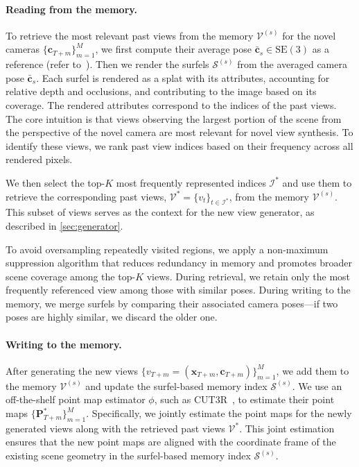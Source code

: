 \paragraph{Reading from the memory.}
To retrieve the most relevant past views from the memory $\mathcal{V}^{(s)}$ for the novel cameras $\{\mathbf{c}_{T+m}\}_{m=1}^M$, we first compute their average pose $\bar{\mathbf{c}}_s \in \mathrm{SE}(3)$ as a reference (refer to~).
Then we render the surfels $\mathcal{S}^{(s)}$ from the averaged camera pose $\bar{\mathbf{c}}_s$.
Each surfel is rendered as a splat with its attributes, accounting for relative depth and occlusions, and contributing to the image based on its coverage.
The rendered attributes correspond to the indices of the past views.
The core intuition is that views observing the largest portion of the scene from the perspective of the novel camera are most relevant for novel view synthesis.
To identify these views, we rank past view indices based on their frequency across all rendered pixels.

We then select the top-$K$ most frequently represented indices $\mathcal{I}^*$ and use them to retrieve the corresponding past views, $\mathcal{V}^* = \{v_t\}_{t \in \mathcal{I}^*}$, from the memory $\mathcal{V}^{(s)}$.
This subset of views serves as the context for the new view generator, as described in \cref{sec:generator}.

To avoid oversampling repeatedly visited regions, we apply a non-maximum suppression algorithm that reduces redundancy in memory and promotes broader scene coverage among the top-$K$ views.
During retrieval, we retain only the most frequently referenced view among those with similar poses.
During writing to the memory, we merge surfels by comparing their associated camera poses—if two poses are highly similar, we discard the older one.

\paragraph{Writing to the memory.}
After generating the new views $\{v_{T+m}=(\mathbf{x}_{T+m},\mathbf{c}_{T+m})\}_{m=1}^M$, we add them to the memory $\mathcal{V}^{(s)}$ and update the surfel-based memory index $\mathcal{S}^{(s)}$.
We use an off-the-shelf point map estimator $\phi$, such as CUT3R~\cite{cut3r}, to estimate their point maps $\{\mathbf{P}^*_{T+m}\}_{m=1}^M$.
Specifically, we jointly estimate the point maps for the newly generated views along with the retrieved past views $\mathcal{V}^*$.
This joint estimation ensures that the new point maps are aligned with the coordinate frame of the existing scene geometry in the surfel-based memory index $\mathcal{S}^{(s)}$.

